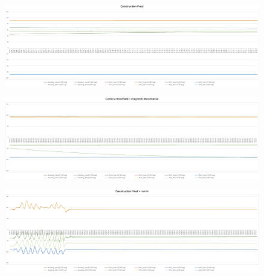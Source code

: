 \documentclass[review]{elsarticle}
\begin{document}
\begin{figure}[htbp!]
\begin{center}
	 	\begin{minipage}{\columnwidth}
	 		\centering
			\subfigure
			{\includegraphics[keepaspectratio, width=1\columnwidth]{graphics/Sensor_Galaxy_run1/sensor_diagramms_galaxys8_1}\label{fig:sensor_sensi:samsung_1st:1}}
	 	\end{minipage} 
	 	\begin{minipage}{\columnwidth}
	 		\centering
			\subfigure 
			{\includegraphics[keepaspectratio, width=1\columnwidth]{graphics/Sensor_Galaxy_run1/sensor_diagramms_galaxys8_2}\label{fig:sensor_sensi:samsung_1st:2}}
	 	\end{minipage}
		\begin{minipage}{\columnwidth} 
	 		\centering
			\subfigure
			{\includegraphics[keepaspectratio, width=1\columnwidth]{graphics/Sensor_Galaxy_run1/sensor_diagramms_galaxys8_3}\label{fig:sensor_sensi:samsung_1st:3}}
	 	\end{minipage}
	\label{fig:sensor_sensi:samsung_1st_a}
\end{center}
\end{figure}
\end{document}
